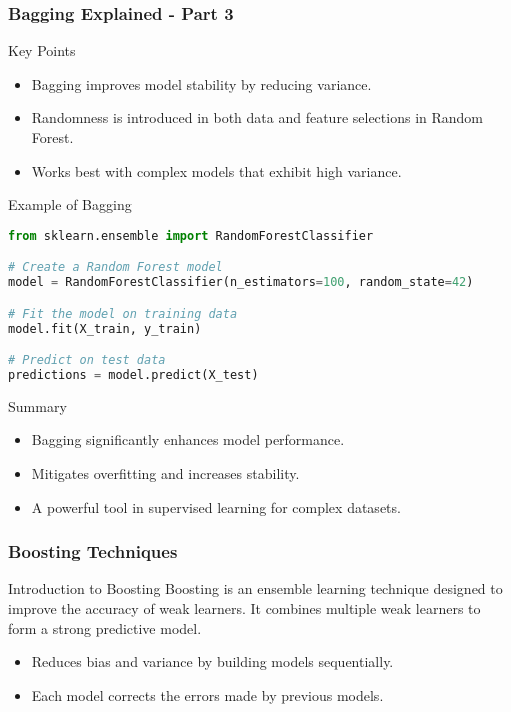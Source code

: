 \documentclass[aspectratio=169]{beamer}
\begin{document}
\begin{frame}[fragile]
    \frametitle{Bagging Explained - Part 3}
    \begin{block}{Key Points}
        \begin{itemize}
            \item Bagging improves model stability by reducing variance.
            \item Randomness is introduced in both data and feature selections in Random Forest.
            \item Works best with complex models that exhibit high variance.
        \end{itemize}
    \end{block}
    
    \begin{block}{Example of Bagging}
        \begin{lstlisting}[language=Python]
from sklearn.ensemble import RandomForestClassifier

# Create a Random Forest model
model = RandomForestClassifier(n_estimators=100, random_state=42)

# Fit the model on training data
model.fit(X_train, y_train)

# Predict on test data
predictions = model.predict(X_test)
        \end{lstlisting}
    \end{block}

    \begin{block}{Summary}
        \begin{itemize}
            \item Bagging significantly enhances model performance.
            \item Mitigates overfitting and increases stability.
            \item A powerful tool in supervised learning for complex datasets.
        \end{itemize}
    \end{block}
\end{frame}

\begin{frame}[fragile]
    \frametitle{Boosting Techniques}
    \begin{block}{Introduction to Boosting}
        Boosting is an ensemble learning technique designed to improve the accuracy of weak learners. It combines multiple weak learners to form a strong predictive model.
    \end{block}
    \begin{itemize}
        \item Reduces bias and variance by building models sequentially.
        \item Each model corrects the errors made by previous models.
    \end{itemize}
\end{frame}
\end{document}
